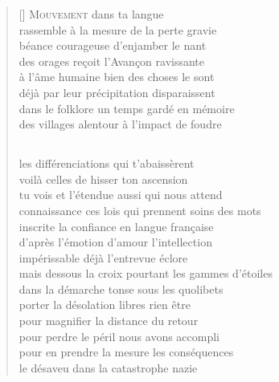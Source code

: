 \documentclass[a4paper, titlepage, twoside, 12pt]{book}
\begin{document}
\settowidth{\versewidth}{dans le folklore un temps gardé en mémoire}
\begin{verse}[\versewidth]
{\lettrine[lines=1]{\textcolor[gray]{0.6}{M}}{\space ouvement}} dans ta langue\\
rassemble à la mesure de la perte gravie\\
béance courageuse d'enjamber le nant\\
des orages reçoit l'Avançon ravissante\\
à l'âme humaine bien des choses le sont\\
déjà par leur précipitation disparaissent\\
dans le folklore un temps gardé en mémoire\\
des villages alentour à l'impact de foudre

\subsection*{}
les différenciations qui t'abaissèrent\\
voilà celles de hisser ton ascension\\
tu vois et l'étendue aussi qui nous attend\\
connaissance ces lois qui prennent soins des mots\\
inscrite la confiance en langue française\\
d'après l'émotion d'amour l'intellection\\
impérissable déjà l'entrevue éclore\\
mais dessous la croix pourtant les gammes d'étoiles\\
dans la démarche tonse sous les quolibets\\
porter la désolation libres rien être\\
pour magnifier la distance du retour\\
pour perdre le péril nous avons accompli\\
pour en prendre la mesure les conséquences\\
le désaveu dans la catastrophe nazie 

\end{verse}

\newpage
\end{document}
